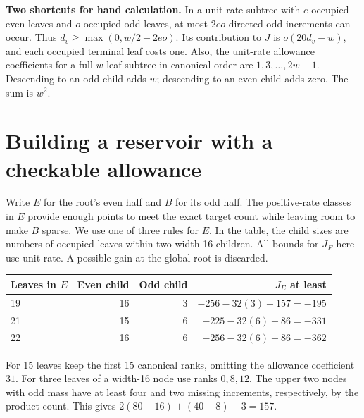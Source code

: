 \documentclass[12pt,letterpaper]{article}
\newcommand{\para}[1]{\par\medskip\noindent\textbf{#1}\quad}
\newcommand{\pagepart}[1]{\clearpage\section{#1}}
\begin{document}
\para{Two shortcuts for hand calculation.} In a unit-rate subtree with \(e\) occupied even leaves and \(o\) occupied odd leaves, at most \(2eo\) directed odd increments can occur. Thus \(d_v\ge\max(0,w/2-2eo)\). Its contribution to \(J\) is \(o(20d_v-w)\), and each occupied terminal leaf costs one. Also, the unit-rate allowance coefficients for a full \(w\)-leaf subtree in canonical order are \(1,3,\ldots,2w-1\). Descending to an odd child adds \(w\); descending to an even child adds zero. The sum is \(w^2\).

\pagepart{Building a reservoir with a checkable allowance}
Write \(E\) for the root's even half and \(B\) for its odd half. The positive-rate classes in \(E\) provide enough points to meet the exact target count while leaving room to make \(B\) sparse. We use one of three rules for \(E\). In the table, the child sizes are numbers of occupied leaves within two width-16 children. All bounds for \(J_E\) here use unit rate. A possible gain at the global root is discarded.
\begin{center}\begin{tabular}{@{}lrrr@{}}\toprule
Leaves in \(E\) & Even child & Odd child & \(J_E\) at least\\\midrule
19 & 16 & 3 & \(-256-32(3)+157=-195\)\\
21 & 15 & 6 & \(-225-32(6)+86=-331\)\\
22 & 16 & 6 & \(-256-32(6)+86=-362\)\\\bottomrule
\end{tabular}\end{center}
For 15 leaves keep the first 15 canonical ranks, omitting the allowance coefficient \(31\). For three leaves of a width-16 node use ranks \(0,8,12\). The upper two nodes with odd mass have at least four and two missing increments, respectively, by the product count. This gives \(2(80-16)+(40-8)-3=157\).
\end{document}
